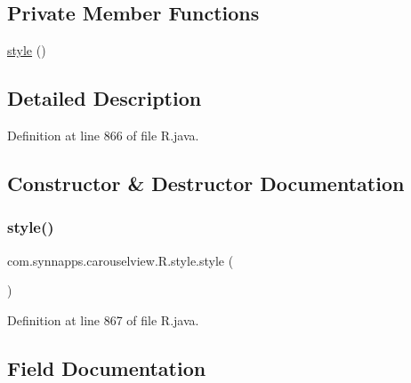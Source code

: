 \subsection*{Private Member Functions}
\begin{DoxyCompactItemize}
\item 
\mbox{\hyperlink{classcom_1_1synnapps_1_1carouselview_1_1_r_1_1style_a961db8da874e9e907f50ba2c354a43d6}{style}} ()
\end{DoxyCompactItemize}


\subsection{Detailed Description}


Definition at line 866 of file R.\+java.



\subsection{Constructor \& Destructor Documentation}
\mbox{\label{classcom_1_1synnapps_1_1carouselview_1_1_r_1_1style_a961db8da874e9e907f50ba2c354a43d6}} 
\subsubsection{\texorpdfstring{style()}{style()}}
{\footnotesize\ttfamily com.\+synnapps.\+carouselview.\+R.\+style.\+style (\begin{DoxyParamCaption}{ }\end{DoxyParamCaption})\hspace{0.3cm}{\ttfamily [private]}}



Definition at line 867 of file R.\+java.


\begin{DoxyCode}{0}

\end{DoxyCode}


\subsection{Field Documentation}
\mbox{\label{classcom_1_1synnapps_1_1carouselview_1_1_r_1_1style_a1944d7b5dad87f20fd0de7f390a56a42}} 
